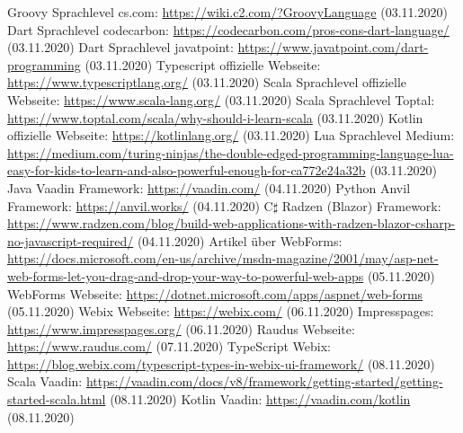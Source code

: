 \documentclass[ngerman]{article}
\begin{document}
\begin{thebibliography}{9}
        Groovy Sprachlevel cs.com: \url{https://wiki.c2.com/?GroovyLanguage} (03.11.2020)
        Dart Sprachlevel codecarbon: \url{https://codecarbon.com/pros-cons-dart-language/} (03.11.2020)
        Dart Sprachlevel javatpoint: \url{https://www.javatpoint.com/dart-programming} (03.11.2020)
        Typescript offizielle Webseite: \url{https://www.typescriptlang.org/} (03.11.2020)
        Scala Sprachlevel offizielle Webseite: \url{https://www.scala-lang.org/} (03.11.2020)
        Scala Sprachlevel Toptal: \url{https://www.toptal.com/scala/why-should-i-learn-scala} (03.11.2020)
        Kotlin offizielle Webseite: \url{https://kotlinlang.org/} (03.11.2020)
        Lua Sprachlevel Medium: \url{https://medium.com/turing-ninjas/the-double-edged-programming-language-lua-easy-for-kids-to-learn-and-also-powerful-enough-for-ca772e24a32b} (03.11.2020)
        Java Vaadin Framework: \url{https://vaadin.com/} (04.11.2020)
        Python Anvil Framework: \url{https://anvil.works/} (04.11.2020)
        C$\sharp$ Radzen (Blazor) Framework: \url{https://www.radzen.com/blog/build-web-applications-with-radzen-blazor-csharp-no-javascript-required/} (04.11.2020)
        Artikel über WebForms: \url{https://docs.microsoft.com/en-us/archive/msdn-magazine/2001/may/asp-net-web-forms-let-you-drag-and-drop-your-way-to-powerful-web-apps} (05.11.2020)
        WebForms Webseite: \url{https://dotnet.microsoft.com/apps/aspnet/web-forms} (05.11.2020)
        Webix Webseite: \url{https://webix.com/} (06.11.2020)
        Impresspages: \url{https://www.impresspages.org/} (06.11.2020)
        Raudus Webseite: \url{https://www.raudus.com/} (07.11.2020)
        TypeScript Webix: \url{https://blog.webix.com/typescript-types-in-webix-ui-framework/} (08.11.2020)
        Scala Vaadin: \url{https://vaadin.com/docs/v8/framework/getting-started/getting-started-scala.html} (08.11.2020)
        Kotlin Vaadin: \url{https://vaadin.com/kotlin} (08.11.2020)

\end{thebibliography}
\end{document}
